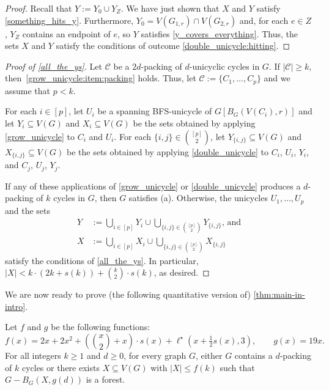 \documentclass{patmorin}
\begin{document}
\begin{proof}
  Recall that $Y:=Y_0\cup Y_Z$.  We have just shown that $X$ and $Y$ satisfy \cref{something_hits_y}.  Furthermore, $Y_0=V(G_{1,r})\cap V(G_{2,r})$ and, for each $e\in Z$, $Y_Z$ contains an endpoint of $e$, so $Y$ satisfies \cref{y_covers_everything}.  Thus, the sets $X$ and $Y$ satisfy the conditions of outcome \cref{double_unicycle:hitting}.
\end{proof}


\begin{proof}[Proof of \cref{all_the_ys}]
  Let $\mathcal{C}$ be a $2d$-packing of $d$-unicyclic cycles in $G$. If $|\mathcal{C}|\geq k$, then~\cref{grow_unicycle:item:packing} holds. Thus, let $\mathcal{C}:=\{C_1,\ldots,C_p\}$ and we assume that $p<k$.

  For each $i\in[p]$, let $U_i$ be a spanning BFS-unicycle of $G[B_G(V(C_i),r)]$ and let $Y_i\subseteq V(G)$ and $X_i\subseteq V(G)$ be the sets obtained by applying \cref{grow_unicycle} to $C_i$ and $U_i$.  For each $\{i,j\}\in \binom{[p]}{2}$, let $Y_{\{i,j\}}\subseteq V(G)$ and $X_{\{i,j\}}\subseteq V(G)$ be the sets obtained by applying \cref{double_unicycle} to $C_i$, $U_i$, $Y_i$, and $C_j$, $U_j$, $Y_j$.

  If any of these applications of \cref{grow_unicycle} or \cref{double_unicycle} produces a $d$-packing of $k$ cycles in $G$, then $G$ satisfies (a).  Otherwise, the unicycles $U_1,\ldots,U_p$ and the sets
  \begin{align*}
    Y & :=\textstyle\bigcup_{i\in[p]} Y_i\cup \bigcup_{\{i,j\}\in\binom{[p]}{2}} Y_{\{i,j\}}\text{, and} \\
    X & :=\textstyle\bigcup_{i\in[p]} X_i\cup \bigcup_{\{i,j\}\in\binom{[p]}{2}} X_{\{i,j\}}
  \end{align*}
  satisfy the conditions of \cref{all_the_ys}.
  In particular, $|X| < k\cdot(2k+s(k))+\binom{k}{2}\cdot s(k)$, as desired.
\end{proof}

We are now ready to prove (the following quantitative version of) \cref{thm:main-in-intro}.

\begin{thm}\label{thm:the-big-ball-of-wax}
  Let $f$ and $g$ be the following functions:
  \[
    \textstyle f(x)
      = 2x+2x^2 + (\binom{x}{2}+x)\cdot s(x) + \ell^\star(x+\tfrac{1}{2}s(x),3), \qquad
    g(x)= 19x.
  \]
  For all integers $k\ge 1$ and $d\ge 0$, for every graph $G$, either $G$ contains a $d$-packing of $k$ cycles or there exists $X\subseteq V(G)$ with $|X|\leq f(k)$ such that $G-B_G(X,g(d))$ is a forest.
\end{thm}
\end{document}
